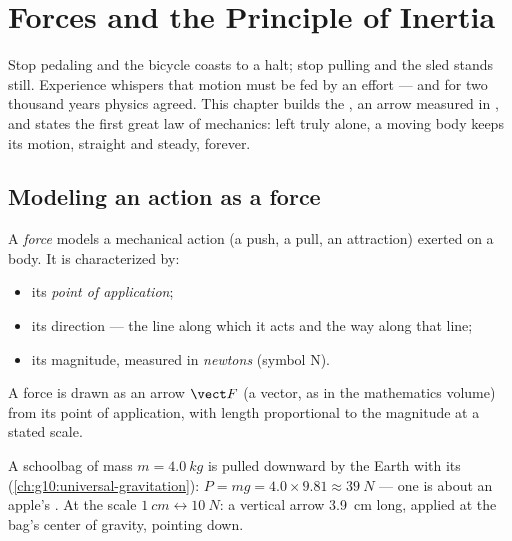 \chapter{Forces and the Principle of Inertia}\label{ch:g10:inertia}

Stop pedaling and the bicycle coasts to a halt; stop pulling and the
sled stands still. Experience whispers that motion must be fed by an
effort --- and for two thousand years physics agreed. This chapter
builds the , an arrow measured in , and states the first
great law of mechanics: left truly alone, a moving body keeps its
motion, straight and steady, forever.

\section{Modeling an action as a force}

\begin{definition}[Force]\label{def:g10:inertia:force}
A \emph{force} models a mechanical action (a push, a pull,
an attraction) exerted on a body. It is characterized by:
\begin{itemize}
  \item its \emph{point of application};
  \item its direction --- the line along which it acts and the way
        along that line;
  \item its magnitude, measured in \emph{newtons}
        (symbol \unit{N}).
\end{itemize}
A force is drawn as an arrow $\vect F$ (a vector, as in the mathematics
volume) from its point of application, with length proportional to the
magnitude at a stated scale.
\end{definition}

\begin{example}\label{ex:g10:inertia:schoolbag}
A schoolbag of mass $m = \qty{4.0}{kg}$ is pulled downward by the Earth
with its  (\cref{ch:g10:universal-gravitation}):
$P = mg = 4.0 \times 9.81 \approx \qty{39}{N}$ --- one  is about
an apple's . At the scale $\qty{1}{cm} \leftrightarrow
\qty{10}{N}$: a vertical arrow \qty{3.9}{cm} long, applied at the
bag's center of gravity, pointing down.
\end{example}


